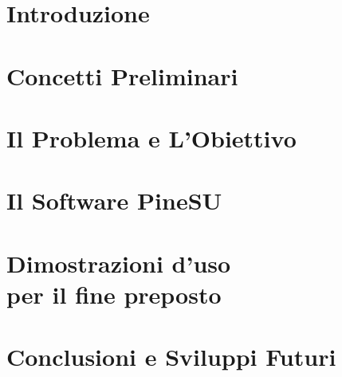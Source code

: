 \documentclass[12pt,a4paper]{report}
\begin{document}
\tableofcontents


 
\chapter{Introduzione}

%

\chapter{Concetti Preliminari}



\chapter{Il Problema e L'Obiettivo}



\chapter{Il Software PineSU}



\chapter{Dimostrazioni d'uso\\per il fine preposto}



\chapter{Conclusioni e Sviluppi Futuri}

%




\cleardoublepage{} %
\end{document}
